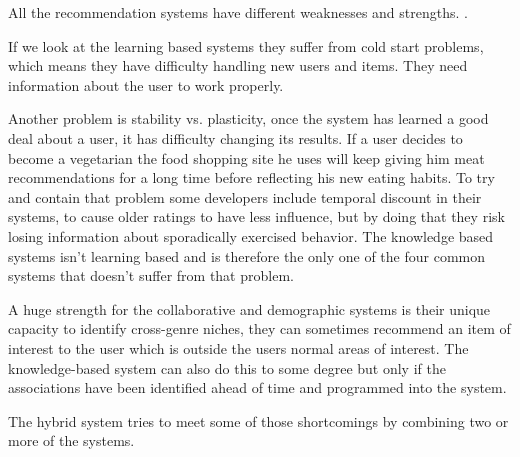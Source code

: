 All the recommendation systems have different weaknesses and strengths. \cite{TheAdaptiveWeb}.

If we look at the learning based systems they suffer from cold start problems, which means they have difficulty handling new users and items. They need information about the user to work properly.

Another problem is stability vs. plasticity, once the system has learned a good deal about a user, it has difficulty changing its results. If a user decides to become a vegetarian the food shopping site he uses will keep giving him meat recommendations for a long time before reflecting his new eating habits. To try and contain that problem some developers include temporal discount in their systems, to cause older ratings to have less influence, but by doing that they risk losing information about sporadically exercised behavior. The knowledge based systems isn't learning based and is therefore the only one of the four common systems that doesn't suffer from that problem.

A huge strength for the collaborative and demographic systems is their unique capacity to identify cross-genre niches, they can sometimes recommend an item of interest to the user which is outside the users normal areas of interest. The knowledge-based system can also do this to some degree but only if the associations have been identified ahead of time and programmed into the system.

The hybrid system tries to meet some of those shortcomings by combining two or more of the systems. 
